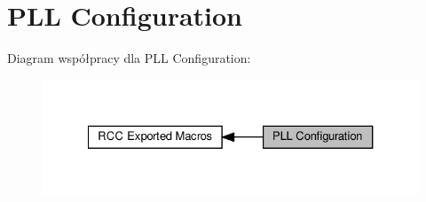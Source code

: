 \hypertarget{group___r_c_c___p_l_l___configuration}{}\section{P\+LL Configuration}
\label{group___r_c_c___p_l_l___configuration}
Diagram współpracy dla P\+LL Configuration\+:\nopagebreak
\begin{figure}[H]
\begin{center}
\leavevmode
\includegraphics[width=327pt]{group___r_c_c___p_l_l___configuration}
\end{center}
\end{figure}
